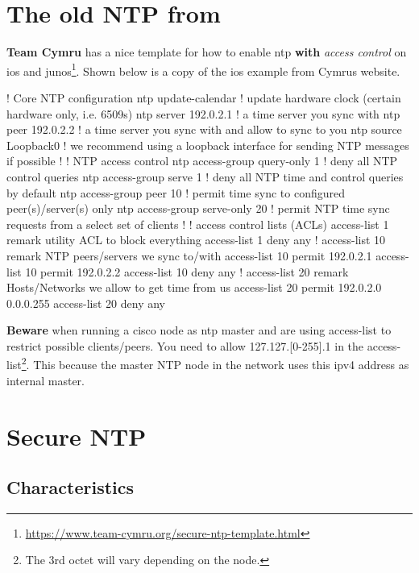 
\section{The old NTP from }

\textbf{Team Cymru} has a nice template for how to enable \gls{ntp} \textbf{with} \textit{access control} on \gls{ios} and \gls{junos}\footnote{\url{https://www.team-cymru.org/secure-ntp-template.html}}. Shown below is a copy of the \gls{ios} example from Cymrus website.

\begin{cisco}
	! Core NTP configuration
	ntp update-calendar             ! update hardware clock (certain hardware only, i.e. 6509s)
	ntp server 192.0.2.1            ! a time server you sync with
	ntp peer   192.0.2.2            ! a time server you sync with and allow to sync to you
	ntp source Loopback0            ! we recommend using a loopback interface for sending NTP messages if possible
	!
	! NTP access control
	ntp access-group query-only 1   ! deny all NTP control queries
	ntp access-group serve 1        ! deny all NTP time and control queries by default
	ntp access-group peer 10        ! permit time sync to configured peer(s)/server(s) only
	ntp access-group serve-only 20  ! permit NTP time sync requests from a select set of clients
	!
	! access control lists (ACLs)
	access-list 1 remark utility ACL to block everything
	access-list 1 deny any
	!
	access-list 10 remark NTP peers/servers we sync to/with
	access-list 10 permit 192.0.2.1
	access-list 10 permit 192.0.2.2
	access-list 10 deny any
	!
	access-list 20 remark Hosts/Networks we allow to get time from us
	access-list 20 permit 192.0.2.0 0.0.0.255
	access-list 20 deny any
\end{cisco}

\textbf{Beware} when running a cisco node as \gls{ntp} master and are using access-list to restrict possible clients/peers. You need to allow 127.127.[0-255].1 in the access-list\footnote{The 3rd octet will vary depending on the node.}. This because the master NTP node in the network uses this \gls{ipv4} address as internal master.

\section{Secure NTP}

\subsection{Characteristics}

